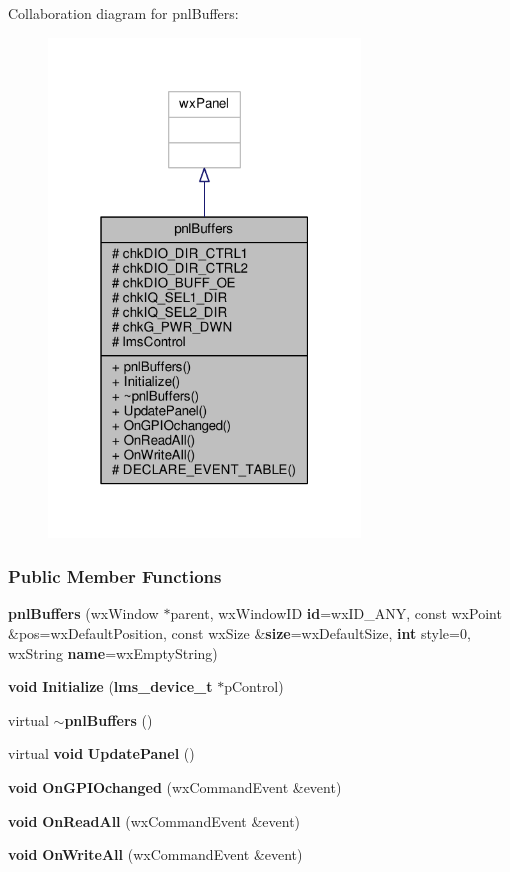 Collaboration diagram for pnl\+Buffers\+:
\nopagebreak
\begin{figure}[H]
\begin{center}
\leavevmode
\includegraphics[width=235pt]{d2/d2e/classpnlBuffers__coll__graph}
\end{center}
\end{figure}
\subsubsection*{Public Member Functions}
\begin{DoxyCompactItemize}
\item 
{\bf pnl\+Buffers} (wx\+Window $\ast$parent, wx\+Window\+ID {\bf id}=wx\+I\+D\+\_\+\+A\+NY, const wx\+Point \&pos=wx\+Default\+Position, const wx\+Size \&{\bf size}=wx\+Default\+Size, {\bf int} style=0, wx\+String {\bf name}=wx\+Empty\+String)
\item 
{\bf void} {\bf Initialize} ({\bf lms\+\_\+device\+\_\+t} $\ast$p\+Control)
\item 
virtual {\bf $\sim$pnl\+Buffers} ()
\item 
virtual {\bf void} {\bf Update\+Panel} ()
\item 
{\bf void} {\bf On\+G\+P\+I\+Ochanged} (wx\+Command\+Event \&event)
\item 
{\bf void} {\bf On\+Read\+All} (wx\+Command\+Event \&event)
\item 
{\bf void} {\bf On\+Write\+All} (wx\+Command\+Event \&event)
\end{DoxyCompactItemize}

